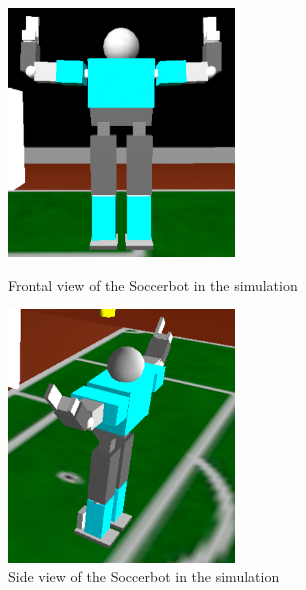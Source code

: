\begin{figure}[htp]
\begin{minipage}[b]{0.5\linewidth} 
\centering
\includegraphics[width=6cm]{fig/soccerbotfront}
\caption{Frontal view of the Soccerbot in the simulation}
\end{minipage}
\hspace{0.5cm}
\begin{minipage}[b]{0.5\linewidth}
\centering
\includegraphics[width=6cm]{fig/soccerbotside}
\caption{Side view of the Soccerbot in the simulation}
\end{minipage}
\end{figure}



